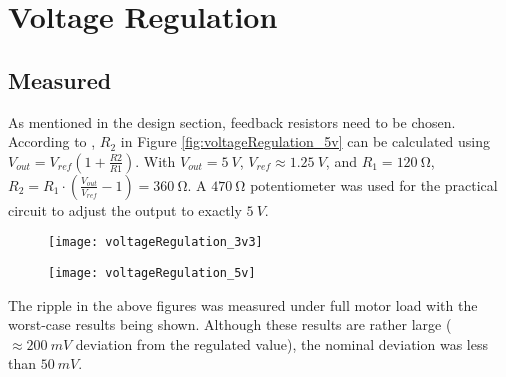 \graphicspath{{content/3_results/figures}}

\section{Voltage Regulation}

\subsection{Measured}

As mentioned in the design section, feedback resistors need to be chosen. According to \cite{datasheetLD1117}, $R_2$ in Figure \ref{fig:voltageRegulation_5v}
can be calculated using $V_{out} = V_{ref} (1 + \frac{R2}{R1})$. With $V_{out} = \SI{5}{V}$, $V_{ref} \approx \SI{1.25}{V}$, and $R_1 = \SI{120}{\ohm}$,
$R_2 = R_1 \cdot \left(\frac{V_{out}}{V_{ref}} - 1\right) = \SI{360}{\ohm}$. A $\SI{470}{\ohm}$ potentiometer was used for the practical circuit to adjust the output to exactly $\SI{5}{V}$.

\begin{figure}[!htb]
    \centering
    \begin{minipage}{.45\textwidth}
        \centering
        \texttt{[image: voltageRegulation\_3v3]}
        \label{fig:voltageRegulation_measure_3v3}
    \end{minipage}
    \begin{minipage}{.45\textwidth}
        \centering
        \texttt{[image: voltageRegulation\_5v]}
        \label{fig:voltageRegulation_measure_5v}
    \end{minipage}
\end{figure}

The ripple in the above figures was measured under full motor load with the worst-case results being shown. Although these results
are rather large ($\approx \SI{200}{mV}$ deviation from the regulated value), the nominal deviation was less than $\SI{50}{mV}$.